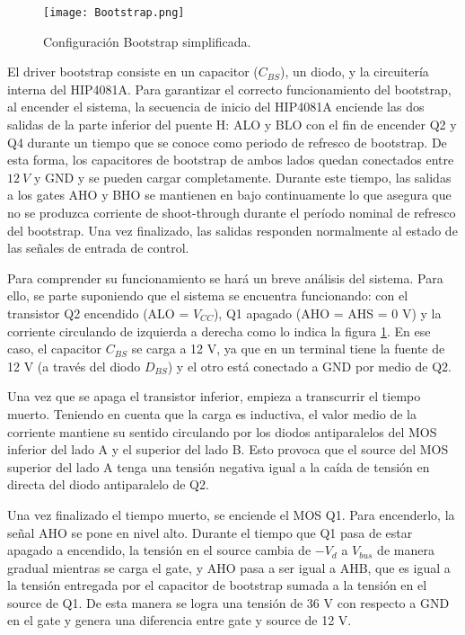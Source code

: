 \begin{figure}[H]
	\centering
	\texttt{[image: Bootstrap.png]}
	\caption{Configuración Bootstrap simplificada.}
	\label{fig:img_bootstrap}
\end{figure}

\noindent El driver bootstrap consiste en un capacitor ($C_{BS}$), un diodo, y la circuitería interna del HIP4081A. Para garantizar el correcto funcionamiento del bootstrap, al encender el sistema, la secuencia de inicio del HIP4081A enciende las dos salidas de la parte inferior del puente H: ALO y BLO con el fin de encender Q2 y Q4 durante un tiempo que se conoce como periodo de refresco de bootstrap. De esta forma, los capacitores de bootstrap de ambos lados quedan conectados entre $12 \:V$ y GND y se pueden cargar completamente. Durante este tiempo, las salidas a los gates AHO y BHO se mantienen en bajo continuamente lo que asegura que no se produzca corriente de shoot-through durante el período nominal de refresco del bootstrap. Una vez finalizado, las salidas responden normalmente al estado de las señales de entrada de control.

\noindent Para comprender su funcionamiento se hará un breve análisis del sistema. Para ello, se parte suponiendo que el sistema se encuentra funcionando: con el transistor Q2 encendido (ALO = $V_{CC}$), Q1 apagado (AHO = AHS = 0 V) y la corriente circulando de izquierda a derecha como lo indica la figura \ref{fig:img_bootstrap}. En ese caso, el capacitor $C_{BS}$ se carga a 12 V, ya que en un terminal tiene la fuente de 12 V (a través del diodo $D_{BS}$) y el otro está conectado a GND por medio de Q2.

\noindent Una vez que se apaga el transistor inferior, empieza a transcurrir el tiempo muerto. Teniendo en cuenta que la carga es inductiva, el valor medio de la corriente mantiene su sentido circulando por los diodos antiparalelos del MOS inferior del lado A y el superior del lado B. Esto provoca que el source del MOS superior del lado A tenga una tensión negativa igual a la caída de tensión en directa del diodo antiparalelo de Q2. 

\noindent Una vez finalizado el tiempo muerto, se enciende el MOS Q1. Para encenderlo, la señal AHO se pone en nivel alto. Durante el tiempo que Q1 pasa de estar apagado a encendido, la tensión en el source cambia de $-V_d$ a $V_{bus}$ de manera gradual mientras se carga el gate, y AHO pasa a ser igual a AHB, que es igual a la tensión entregada por el capacitor de bootstrap sumada a la tensión en el source de Q1. De esta manera se logra una tensión de 36 V con respecto a GND en el gate y genera una diferencia entre gate y source de 12 V.

